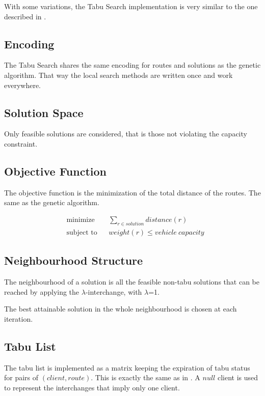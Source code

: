\documentclass{article} %
\begin{document}
{With some variations, the Tabu Search implementation is very similar to the one described in \citep{osman1993}.


\subsection{Encoding}

The Tabu Search shares the same encoding for routes and solutions as the genetic algorithm. That way the local search methods are written once and work everywhere.

\subsection{Solution Space}

Only feasible solutions are considered, that is those not violating the capacity constraint.


\subsection{Objective Function}

The objective function is the minimization of the total distance of the routes. The same as the genetic algorithm.

\begin{equation*}
\begin{aligned}
& \text{minimize}
& & \sum\limits_{r \in solution} distance(r) \\
& \text{subject to}
& & weight(r) \leq vehicle\ capacity
\end{aligned}
\end{equation*}


\subsection{Neighbourhood Structure}

The neighbourhood of a solution is all the feasible non-tabu solutions that can be reached by applying the $\lambda$-interchange, with $\lambda$=1.\newline

The best attainable solution in the whole neighbourhood is chosen at each iteration.


\subsection{Tabu List}

The tabu list is implemented as a matrix keeping the expiration of tabu status for pairs of $(client, route)$. This is exactly the same as in \citep{osman1993}. A $null$ client is used to represent the interchanges that imply only one client.\newline

}
\end{document}

